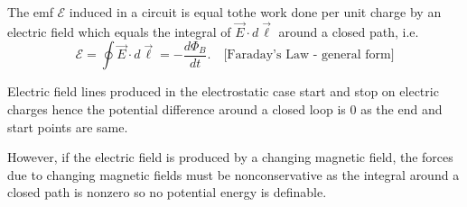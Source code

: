 \begin{definition}
    The emf $\mathscr{E}$ induced in a circuit is equal tothe work done per unit charge by an electric field which equals the integral of $\vec{E}\cdot d\vec{\ell}$ around a closed path, i.e.
    $$\mathscr{E} = \oint \vec{E} \cdot d \vec{\ell} = -\frac{d\Phi_B}{dt}. \quad \text{[Faraday's Law - general form]}$$
\end{definition}
\begin{note}
    Electric field lines produced in the electrostatic case start and stop on electric charges hence the potential difference around a closed loop is 0 as the end and start points are same. 
    
    However, if the electric field is produced by a changing magnetic field, the forces due to changing magnetic fields must be nonconservative as the integral around a closed path is nonzero so no potential energy is definable.
\end{note}